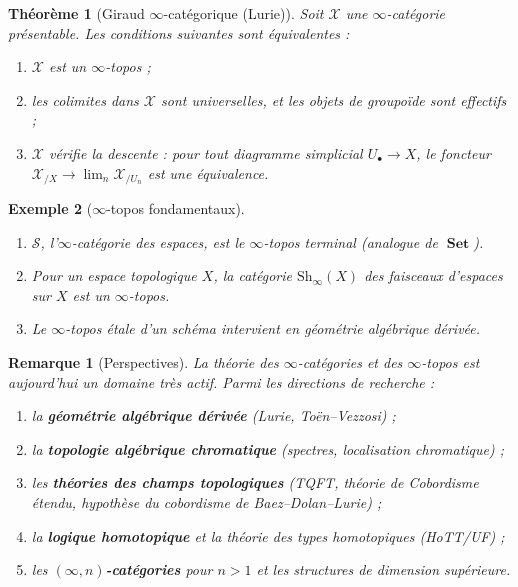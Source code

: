 \documentclass[a4paper,12pt]{book}
\DeclareMathOperator{\Set}{\mathbf{Set}}
\newtheorem{theoreme}{Théorème}[chapter]
\newtheorem{exemple}[theoreme]{Exemple}
\newtheorem*{remarque}{Remarque}
\begin{document}
\begin{theoreme}[Giraud $\infty$-catégorique (Lurie)]
\label{thm:giraud-infty}
Soit $\mathcal{X}$ une $\infty$-catégorie présentable.
Les conditions suivantes sont équivalentes :
\begin{enumerate}[label=(\alph*)]
\item $\mathcal{X}$ est un $\infty$-topos ;
\item les colimites dans $\mathcal{X}$ sont universelles, et les
      objets de groupoïde sont effectifs ;
\item $\mathcal{X}$ vérifie la descente : pour tout diagramme
      simplicial $U_\bullet \to X$, le foncteur
      $\mathcal{X}_{/X} \to \lim_n \mathcal{X}_{/U_n}$ est une
      équivalence.
\end{enumerate}
\end{theoreme}

\begin{exemple}[$\infty$-topos fondamentaux]\label{ex:infty-topos}
\begin{enumerate}[label=(\roman*)]
\item $\mathcal{S}$, l'$\infty$-catégorie des espaces, est le
      $\infty$-topos terminal (analogue de $\Set$).
\item Pour un espace topologique $X$, la catégorie
      $\mathrm{Sh}_\infty(X)$ des faisceaux d'espaces sur $X$ est
      un $\infty$-topos.
\item Le $\infty$-topos étale d'un schéma intervient en géométrie
      algébrique dérivée.
\end{enumerate}
\end{exemple}

\begin{remarque}[Perspectives]\label{rem:perspectives}
La théorie des $\infty$-catégories et des $\infty$-topos est
aujourd'hui un domaine très actif.  Parmi les directions de
recherche :
\begin{enumerate}[label=(\roman*)]
\item la \textbf{géométrie algébrique dérivée} (Lurie, Toën--Vezzosi) ;
\item la \textbf{topologie algébrique chromatique}
      (spectres, localisation chromatique) ;
\item les \textbf{théories des champs topologiques}
      (TQFT, théorie de Cobordisme étendu,
      hypothèse du cobordisme de Baez--Dolan--Lurie) ;
\item la \textbf{logique homotopique} et la théorie des types
      homotopiques (HoTT/UF) ;
\item les \textbf{$(\infty,n)$-catégories} pour $n > 1$ et les
      structures de dimension supérieure.
\end{enumerate}
\end{remarque}
\end{document}
